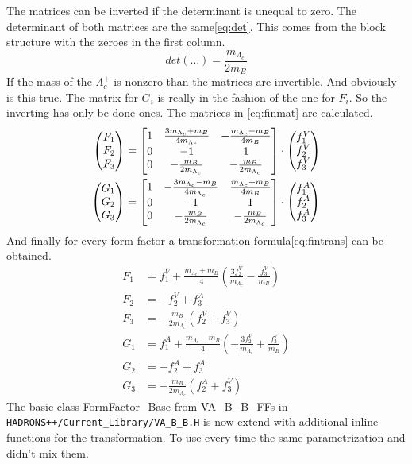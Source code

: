 The matrices can be inverted if the determinant is unequal to zero. The 
determinant of both matrices are the same{\eqref{eq:det}}. This comes from the 
block structure with the zeroes in the first column.
\begin{equation}
  det (\dots) = \frac{m_{\Lambda_c}}{2 m_B} \label{eq:det}
\end{equation}
If the mass of the \(\Lambda_c^+\) is nonzero than the matrices are invertible. And obviously 
is this true. The matrix for \(G_i\) is really in the fashion of the one for 
\(F_i\). So the inverting has only be done ones. The matrices in {\eqref{eq:finmat}}
are calculated.
\begin{align}
  \Spvek{F_1; F_2; F_3} & =
  \begin{bmatrix}
    1 & \frac{3 m_{\Lambda_c} + m_B }{4 m_{\Lambda_c}} & -\frac{m_{\Lambda_c} + m_B }{4 m_B} \\
    0 & -1 & 1 \\
    0 & -\frac{m_B}{2 m_{\Lambda_c}} & -\frac{m_B}{2 m_{\Lambda_c}} \\
  \end{bmatrix}
  \cdot \Spvek{f^V_1; f^V_2; f^V_3} \nonumber \\
  \Spvek{G_1; G_2; G_3} & =
  \begin{bmatrix}
    1 & -\frac{3 m_{\Lambda_c} - m_B }{4 m_{\Lambda_c}} & \frac{m_{\Lambda_c} + m_B }{4 m_B} \\
    0 & -1 & 1 \\
    0 & -\frac{m_B}{2 m_{\Lambda_c}} & -\frac{m_B}{2 m_{\Lambda_c}} \\
  \end{bmatrix}
  \cdot \Spvek{f^A_1; f^A_2; f^A_3}  \label{eq:finmat}
\end{align}
And finally for every form factor a transformation formula{\eqref{eq:fintrans}} 
can be obtained.
\begin{align}
  F_1 & = f^V_1 + \frac{m_{\Lambda_c} + m_B }{4} \left( \frac{3 f^V_2}{m_{\Lambda_c}} - \frac{f^V_3}{m_B} \right) \nonumber \\
  F_2 & = - f^V_2 + f^A_3 \nonumber \\
  F_3 & = - \frac{m_B}{2 m_{\Lambda_c}} \left(f^V_2 + f^V_3 \right) \nonumber \\
  G_1 & = f^A_1 + \frac{m_{\Lambda_c} - m_B }{4} \left( - \frac{3 f^V_2}{m_{\Lambda_c}} + \frac{f^V_3}{m_B} \right) \nonumber \\
  G_2 & = - f^A_2 + f^A_3 \nonumber \\
  G_3 & = - \frac{m_B}{2 m_{\Lambda_c}} \left(f^A_2 + f^V_3 \right) \label{eq:fintrans}
\end{align}
The basic class FormFactor\_Base from VA\_B\_B\_FFs in \texttt{HADRONS++/Current\_Library/VA\_B\_B.H} 
is now extend with additional inline functions for the transformation. To use 
every time the same parametrization and didn't mix them.

